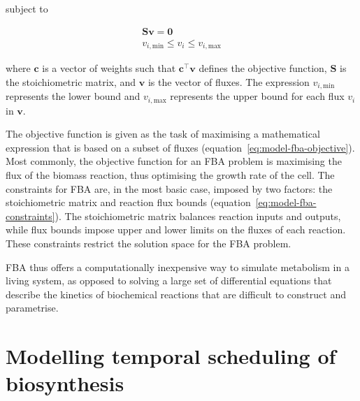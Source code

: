 subject to

\begin{equation}
  \begin{gathered}
    \mathbf{S} \mathbf{v} = \mathbf{0}\\
    v_{i,\mathrm{min}} \leq v_{i} \leq v_{i,\mathrm{max}}
  \end{gathered}
  \label{eq:model-fba-constraints}
\end{equation}

where $\mathbf{c}$ is a vector of weights such that $\mathbf{c}^{\intercal} \mathbf{v}$ defines the objective function, $\mathbf{S}$ is the stoichiometric matrix, and $\mathbf{v}$ is the vector of fluxes. The expression $v_{i,\mathrm{min}}$ represents the lower bound and $v_{i,\mathrm{max}}$ represents the upper bound for each flux $v_{i}$ in $\mathbf{v}$.

The objective function is given as the task of maximising a mathematical expression that is based on a subset of fluxes (equation~\ref{eq:model-fba-objective}).
Most commonly, the objective function for an FBA problem is maximising the flux of the biomass reaction, thus optimising the growth rate of the cell.
The constraints for FBA are, in the most basic case, imposed by two factors:
the stoichiometric matrix and reaction flux bounds (equation~\ref{eq:model-fba-constraints}).
The stoichiometric matrix balances reaction inputs and outputs, while flux bounds impose upper and lower limits on the fluxes of each reaction.
These constraints restrict the solution space for the FBA problem.

FBA thus offers a computationally inexpensive way to simulate metabolism in a living system, as opposed to solving a large set of differential equations that describe the kinetics of biochemical reactions that are difficult to construct and parametrise.

\section{Modelling temporal scheduling of biosynthesis}
\label{sec:model-temporal}


